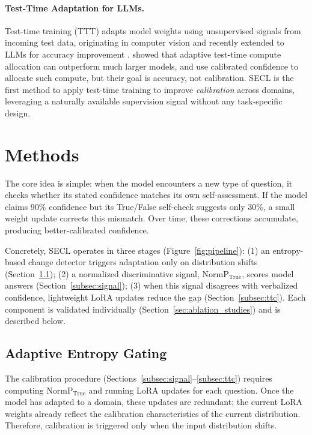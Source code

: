 \documentclass[11pt]{article}
\begin{document}
\paragraph{Test-Time Adaptation for LLMs.}
Test-time training (TTT) adapts model weights using unsupervised signals from incoming test data, originating in computer vision \cite{sun_testtime_2020, wang_tent_2021, wang_continual_2022} and recently extended to LLMs for accuracy improvement \cite{hardt_testtime_2024, hu_testtime_2025, sun_learning_2025, zweiger_selfadapting_2025}. \citet{snell_scaling_2025} showed that adaptive test-time compute allocation can outperform much larger models, and \citet{huang_efficient_2025} use calibrated confidence to allocate such compute, but their goal is accuracy, not calibration. SECL is the first method to apply test-time training to improve \emph{calibration} across domains, leveraging a naturally available supervision signal without any task-specific design.

\section{Methods} \label{sec:methods}
The core idea is simple: when the model encounters a new type of question, it checks whether its stated confidence matches its own self-assessment. If the model claims 90\% confidence but its True/False self-check suggests only 30\%, a small weight update corrects this mismatch. Over time, these corrections accumulate, producing better-calibrated confidence.

Concretely, SECL operates in three stages (Figure~\ref{fig:pipeline}): 
(1) an entropy-based change detector triggers adaptation only on distribution shifts (Section~\ref{subsec:gating}); 
(2) a normalized discriminative signal, $\text{NormP}_{\text{True}}$, scores model answers (Section~\ref{subsec:signal}); 
(3) when this signal disagrees with verbalized confidence, lightweight LoRA updates reduce the gap (Section~\ref{subsec:ttc}). 
Each component is validated individually (Section~\ref{sec:ablation_studies}) and is described below.

\subsection{Adaptive Entropy Gating} \label{subsec:gating}

The calibration procedure (Sections~\ref{subsec:signal}--\ref{subsec:ttc}) requires computing $\text{NormP}_{\text{True}}$ and running LoRA updates for each question. Once the model has adapted to a domain, these updates are redundant; the current LoRA weights already reflect the calibration characteristics of the current distribution. Therefore, calibration is triggered only when the input distribution shifts.
\end{document}
